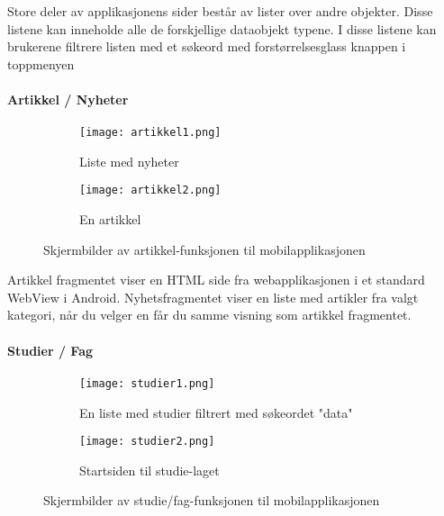\documentclass[../main.tex]{subfiles}
\begin{document}
Store deler av applikasjonens sider består av lister over andre objekter. Disse listene kan inneholde alle de forskjellige dataobjekt typene. I disse listene kan brukerene filtrere listen med et søkeord med forstørrelsesglass knappen i toppmenyen


\paragraph{Artikkel / Nyheter}

\begin{figure}[H]
        \centering
        \begin{subfigure}[b]{0.3\textwidth}
                \centering
                \texttt{[image: artikkel1.png]}
                \caption{Liste med nyheter}
        \end{subfigure}
        \quad
        \begin{subfigure}[b]{0.3\textwidth}
                \centering
                \texttt{[image: artikkel2.png]}
                \caption{En artikkel}
        \end{subfigure}
        \caption{Skjermbilder av artikkel-funksjonen til mobilapplikasjonen}
\end{figure}

Artikkel fragmentet viser en HTML side fra webapplikasjonen i et standard WebView i Android. Nyhetsfragmentet viser en liste med artikler fra valgt kategori, når du velger en får du samme visning som artikkel fragmentet.

\paragraph{Studier / Fag}

\begin{figure}[H]
        \centering
        \begin{subfigure}[b]{0.3\textwidth}
                \centering
                \texttt{[image: studier1.png]}
                \caption{En liste med studier filtrert med søkeordet "data"}
        \end{subfigure}
        \quad
        \begin{subfigure}[b]{0.3\textwidth}
                \centering
                \texttt{[image: studier2.png]}
                \caption{Startsiden til studie-laget}
        \end{subfigure}
        \caption{Skjermbilder av studie/fag-funksjonen til mobilapplikasjonen}
\end{figure}
\end{document}
